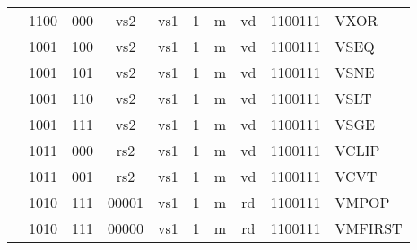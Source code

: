 \begin{table}[p]
\begin{small}
\begin{center}
\begin{tabular}{p{0in}p{0.4in}p{0.1in}p{0.3in}p{0.5in}p{0.5in}p{0.1in}p{0.3in}p{0.5in}p{0.7in}l}
&
\multicolumn{1}{|c|}{1100} &
\multicolumn{2}{c|}{000} &
\multicolumn{1}{c|}{vs2} &
\multicolumn{1}{c|}{vs1} &
\multicolumn{1}{c|}{1} &
\multicolumn{1}{c|}{m} &
\multicolumn{1}{c|}{vd} &
\multicolumn{1}{c|}{1100111} & VXOR \\
\cline{2-10}
  

&
\multicolumn{1}{|c|}{1001} &
\multicolumn{2}{c|}{100} &
\multicolumn{1}{c|}{vs2} &
\multicolumn{1}{c|}{vs1} &
\multicolumn{1}{c|}{1} &
\multicolumn{1}{c|}{m} &
\multicolumn{1}{c|}{vd} &
\multicolumn{1}{c|}{1100111} & VSEQ \\
\cline{2-10}
  

&
\multicolumn{1}{|c|}{1001} &
\multicolumn{2}{c|}{101} &
\multicolumn{1}{c|}{vs2} &
\multicolumn{1}{c|}{vs1} &
\multicolumn{1}{c|}{1} &
\multicolumn{1}{c|}{m} &
\multicolumn{1}{c|}{vd} &
\multicolumn{1}{c|}{1100111} & VSNE \\
\cline{2-10}
  

&
\multicolumn{1}{|c|}{1001} &
\multicolumn{2}{c|}{110} &
\multicolumn{1}{c|}{vs2} &
\multicolumn{1}{c|}{vs1} &
\multicolumn{1}{c|}{1} &
\multicolumn{1}{c|}{m} &
\multicolumn{1}{c|}{vd} &
\multicolumn{1}{c|}{1100111} & VSLT \\
\cline{2-10}
  

&
\multicolumn{1}{|c|}{1001} &
\multicolumn{2}{c|}{111} &
\multicolumn{1}{c|}{vs2} &
\multicolumn{1}{c|}{vs1} &
\multicolumn{1}{c|}{1} &
\multicolumn{1}{c|}{m} &
\multicolumn{1}{c|}{vd} &
\multicolumn{1}{c|}{1100111} & VSGE \\
\cline{2-10}
  

&
\multicolumn{1}{|c|}{1011} &
\multicolumn{2}{c|}{000} &
\multicolumn{1}{c|}{rs2} &
\multicolumn{1}{c|}{vs1} &
\multicolumn{1}{c|}{1} &
\multicolumn{1}{c|}{m} &
\multicolumn{1}{c|}{vd} &
\multicolumn{1}{c|}{1100111} & VCLIP \\
\cline{2-10}
  

&
\multicolumn{1}{|c|}{1011} &
\multicolumn{2}{c|}{001} &
\multicolumn{1}{c|}{rs2} &
\multicolumn{1}{c|}{vs1} &
\multicolumn{1}{c|}{1} &
\multicolumn{1}{c|}{m} &
\multicolumn{1}{c|}{vd} &
\multicolumn{1}{c|}{1100111} & VCVT \\
\cline{2-10}
  

&
\multicolumn{1}{|c|}{1010} &
\multicolumn{2}{c|}{111} &
\multicolumn{1}{c|}{00001} &
\multicolumn{1}{c|}{vs1} &
\multicolumn{1}{c|}{1} &
\multicolumn{1}{c|}{m} &
\multicolumn{1}{c|}{rd} &
\multicolumn{1}{c|}{1100111} & VMPOP \\
\cline{2-10}
  

&
\multicolumn{1}{|c|}{1010} &
\multicolumn{2}{c|}{111} &
\multicolumn{1}{c|}{00000} &
\multicolumn{1}{c|}{vs1} &
\multicolumn{1}{c|}{1} &
\multicolumn{1}{c|}{m} &
\multicolumn{1}{c|}{rd} &
\multicolumn{1}{c|}{1100111} & VMFIRST \\
\cline{2-10}
  


\end{tabular}
\end{center}
\end{small}
\end{table}
